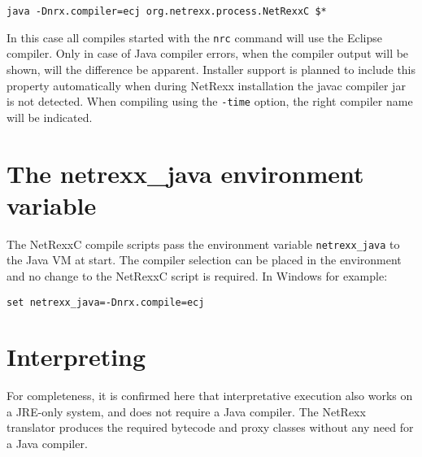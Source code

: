 \begin{verbatim}
java -Dnrx.compiler=ecj org.netrexx.process.NetRexxC $*
\end{verbatim}
 
In this case all compiles started with the \texttt{nrc} command will use the Eclipse compiler. Only in case of Java compiler errors, when the compiler output will be shown, will the difference be apparent. Installer support is planned to include this property automatically when during NetRexx installation the javac compiler jar is not detected. When compiling using the \texttt{-time} option, the right compiler name will be indicated.
\section{The netrexx\_java environment variable}
The NetRexxC compile scripts pass the environment variable \texttt{netrexx\_java} to the Java VM at start. The compiler selection can be placed in the environment and no change to the NetRexxC script is required. In Windows for example:
\begin{verbatim}
set netrexx_java=-Dnrx.compile=ecj
\end{verbatim}

\section{Interpreting}
For completeness, it is confirmed here that interpretative execution also works on a JRE-only system, and does not require a Java compiler. The NetRexx translator produces the required bytecode and proxy classes without any need for a Java compiler.
 